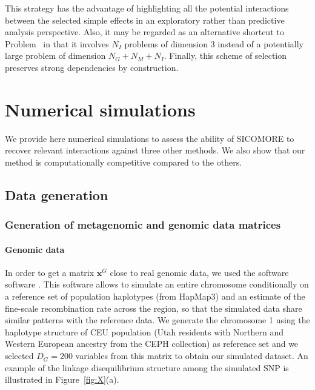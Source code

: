 \documentclass[]{book}
\let\oldparagraph\paragraph
\renewcommand{\paragraph}[1]{\oldparagraph{#1}\mbox{}}
\begin{document}
This strategy has the advantage of highlighting all the potential
interactions between the selected simple effects in an exploratory
rather than predictive analysis perspective. Also, it may be regarded as
an alternative shortcut to Problem~ in that it involves \(N_I\) problems
of dimension \(3\) instead of a potentially large problem of dimension
\(N_{\mathit{G}} + N_{\mathit{M}} + N_I\). Finally, this scheme of selection preserves
strong dependencies by construction.

\hypertarget{XPsimu}{%
\section{Numerical simulations}\label{XPsimu}}

We provide here numerical simulations to assess the ability of SICOMORE
to recover relevant interactions against three other methods. We also
show that our method is computationally competitive compared to the
others.

\hypertarget{data-generation}{%
\subsection{Data generation}\label{data-generation}}

\hypertarget{generation-of-metagenomic-and-genomic-data-matrices}{%
\subsubsection*{Generation of metagenomic and genomic data matrices}\label{generation-of-metagenomic-and-genomic-data-matrices}}

\hypertarget{genomic-data}{%
\paragraph{Genomic data}\label{genomic-data}}

In order to get a matrix \(\mathbf{x}^{\mathit{G}}\) close to real genomic data, we used
the software software \citep{su_hapgen2_2011}. This software allows to
simulate an entire chromosome conditionally on a reference set of
population haplotypes (from HapMap3) and an estimate of the fine-scale
recombination rate across the region, so that the simulated data share
similar patterns with the reference data. We generate the chromosome 1
using the haplotype structure of CEU population (Utah residents with
Northern and Western European ancestry from the CEPH collection) as
reference set and we selected \(D_\mathit{G}=200\) variables from this matrix to
obtain our simulated dataset. An example of the linkage disequilibrium
structure among the simulated SNP is illustrated in Figure~\ref{fig:X}(a).
\end{document}
